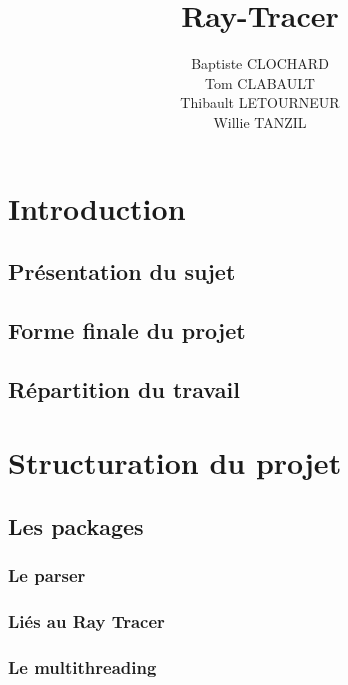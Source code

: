 \documentclass[11pt]{article}
\author{Baptiste CLOCHARD \\
    Tom CLABAULT\\
    Thibault LETOURNEUR\\
    Willie TANZIL}
\title{Ray-Tracer}
\date{}
\begin{document}
\maketitle
\newpage
\tableofcontents
\newpage

\maketitle

\section{Introduction}

    \subsection{Présentation du sujet}
    \subsection{Forme finale du projet}
    \subsection{Répartition du travail}

%

\section{Structuration du projet}
    \subsection{Les packages}
        \subsubsection{Le parser}
        \subsubsection{Liés au Ray Tracer}
            

        \subsubsection{Le multithreading}
	  
\end{document}
